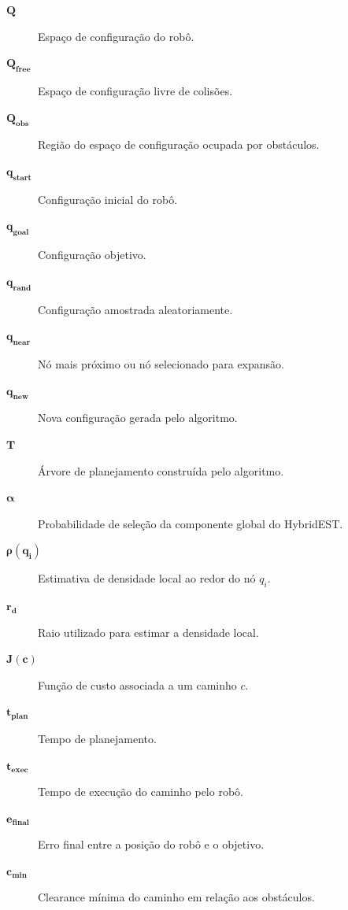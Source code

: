\begin{description}
    \item[\(\mathbf{Q}\)] \quad Espaço de configuração do robô.
    
    \item[\(\mathbf{Q_{free}}\)] \quad Espaço de configuração livre de colisões.
    
    \item[\(\mathbf{Q_{obs}}\)] \quad Região do espaço de configuração ocupada por obstáculos.
    
    \item[\(\mathbf{q_{start}}\)] \quad Configuração inicial do robô.
    
    \item[\(\mathbf{q_{goal}}\)] \quad Configuração objetivo.
    
    \item[\(\mathbf{q_{rand}}\)] \quad Configuração amostrada aleatoriamente.
    
    \item[\(\mathbf{q_{near}}\)] \quad Nó mais próximo ou nó selecionado para expansão.
    
    \item[\(\mathbf{q_{new}}\)] \quad Nova configuração gerada pelo algoritmo.
    
    \item[\(\mathbf{T}\)] \quad Árvore de planejamento construída pelo algoritmo.
    
    \item[\(\boldsymbol{\alpha}\)] \quad Probabilidade de seleção da componente global do HybridEST.
    
    \item[\(\boldsymbol{\rho(q_i)}\)] \quad Estimativa de densidade local ao redor do nó \(q_i\).
    
    \item[\(\mathbf{r_d}\)] \quad Raio utilizado para estimar a densidade local.
    
    \item[\(\mathbf{J(c)}\)] \quad Função de custo associada a um caminho \(c\).
    
    \item[\(\mathbf{t_{plan}}\)] \quad Tempo de planejamento.
    
    \item[\(\mathbf{t_{exec}}\)] \quad Tempo de execução do caminho pelo robô.
    
    \item[\(\mathbf{e_{final}}\)] \quad Erro final entre a posição do robô e o objetivo.
    
    \item[\(\mathbf{c_{min}}\)] \quad Clearance mínima do caminho em relação aos obstáculos.
\end{description}